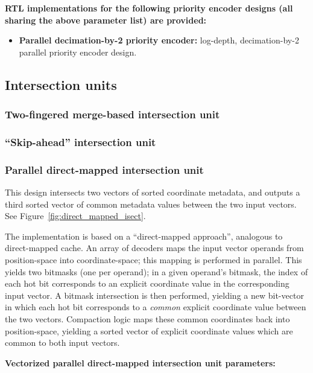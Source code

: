 \textbf{RTL implementations for the following priority encoder designs (all sharing the above parameter list) are provided:}

\begin{itemize}
    \item \textbf{Parallel decimation-by-2 priority encoder\cite{recursive_priority_encoder}:} log-depth, decimation-by-2 parallel priority encoder design.
\end{itemize}

\subsection{Intersection units}

\subsubsection{Two-fingered merge-based intersection unit}

\subsubsection{``Skip-ahead'' intersection unit}

\subsubsection{Parallel direct-mapped intersection unit}

This design intersects two vectors of sorted coordinate metadata, and outputs a third sorted vector of common metadata values between the two input vectors. See Figure~\ref{fig:direct_mapped_isect}.

The implementation is based on a ``direct-mapped approach'', analogous to direct-mapped cache. An array of decoders maps the input vector operands from position-space into coordinate-space; this mapping is performed in parallel. This yields two bitmasks (one per operand); in a given operand's bitmask, the index of each hot bit corresponds to an explicit coordinate value in the corresponding input vector. A bitmask intersection is then performed, yielding a new bit-vector in which each hot bit corresponds to a \textit{common} explicit coordinate value between the two vectors. Compaction logic maps these common coordinates back into position-space, yielding a sorted vector of explicit coordinate values which are common to both input vectors.

\textbf{Vectorized parallel direct-mapped intersection unit parameters:}

